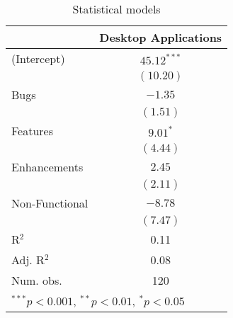 
\begin{table}
\begin{center}
\begin{tabular}{l c }
\hline
               & Desktop Applications \\
\hline
(Intercept)    & $45.12^{***}$ \\
               & $(10.20)$     \\
Bugs           & $-1.35$       \\
               & $(1.51)$      \\
Features       & $9.01^{*}$    \\
               & $(4.44)$      \\
Enhancements   & $2.45$        \\
               & $(2.11)$      \\
Non-Functional & $-8.78$       \\
               & $(7.47)$      \\
\hline
R$^2$          & 0.11          \\
Adj. R$^2$     & 0.08          \\
Num. obs.      & 120           \\
\hline
\multicolumn{2}{l}{\scriptsize{$^{***}p<0.001$, $^{**}p<0.01$, $^*p<0.05$}}
\end{tabular}
\caption{Statistical models}
\label{tab:desktopModel}
\end{center}
\end{table}
